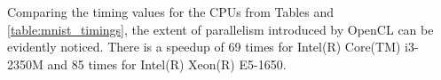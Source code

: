 Comparing the timing values for the CPUs from Tables and \ref{table:mnist_timings}, the extent of parallelism introduced by OpenCL can be evidently noticed. There is a speedup of 69 times for Intel(R) Core(TM) i3-2350M and 85 times for Intel(R) Xeon(R) E5-1650. 
\newline\newline
